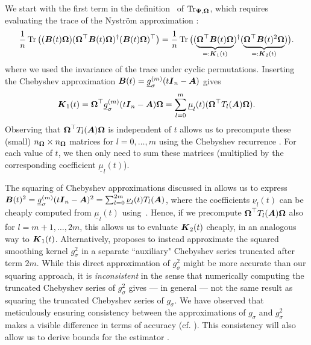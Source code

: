 We start with the first term in the definition~ of $\operatorname{Tr}_{\boldsymbol{\Psi}, \boldsymbol{\Omega}}$, which requires evaluating the trace of the 
Nyström approximation :
\begin{equation}
    \frac{1}{n} \operatorname{Tr} \big((\boldsymbol{B}(t) \boldsymbol{\Omega}) (\boldsymbol{\Omega}^{\top} \boldsymbol{B}(t) \boldsymbol{\Omega})^{\dagger} (\boldsymbol{B}(t) \boldsymbol{\Omega})^{\top} \big) =
    \frac{1}{n} \operatorname{Tr} \big((\underbrace{\boldsymbol{\Omega}^{\top} \boldsymbol{B}(t) \boldsymbol{\Omega}}_{=: \boldsymbol{K}_1(t)})^{\dagger} (\underbrace{\boldsymbol{\Omega}^{\top} \boldsymbol{B}(t)^2 \boldsymbol{\Omega}}_{=: \boldsymbol{K}_2(t)}) \big).
    \label{equ:cyclic-property}
\end{equation}
where we used the invariance of the trace under cyclic permutations.
Inserting the Chebyshev approximation  $\boldsymbol{B}(t) = \underline{g}_{\sigma}^{(m)}(t \boldsymbol{I}_n - \boldsymbol{A})$ gives
\begin{equation}
    \boldsymbol{K}_1(t) = \boldsymbol{\Omega}^{\top} \underline{g}_{\sigma}^{(m)}(t \boldsymbol{I}_n - \boldsymbol{A}) \boldsymbol{\Omega} = \sum_{l=0}^{m} \underline{\mu}_l(t) (\boldsymbol{\Omega}^{\top} T_l(\boldsymbol{A}) \boldsymbol{\Omega}).
\end{equation}
Observing that $\boldsymbol{\Omega}^{\top} T_l(\boldsymbol{A}) \boldsymbol{\Omega}$ is independent of $t$ allows us to precompute these (small) $n_{\boldsymbol{\Omega}} \times n_{\boldsymbol{\Omega}}$ matrices for $l=0, \dots, m$ using the Chebyshev recurrence . For each value of $t$, we then only need to sum these matrices (multiplied by the corresponding coefficient $\underline{\mu}_l(t)$).

The squaring of Chebyshev approximations discussed in  allows us to express $\boldsymbol{B}(t)^2 = \underline{g}_{\sigma}^{(m)}(t \boldsymbol{I}_n - \boldsymbol{A})^2 = \sum_{l=0}^{2m} \underline{\nu}_l(t) T_l(\boldsymbol{A})$, where the coefficients $\underline{\nu}_l(t)$ can be cheaply computed from $\underline{\mu}_l(t)$ using~. Hence, if we precompute
$\boldsymbol{\Omega}^{\top} T_l(\boldsymbol{A}) \boldsymbol{\Omega}$
also for $l=m+1, \dots, 2m$, this allows us to evaluate $\boldsymbol{K}_2(t)$ cheaply, in an analogous way to $\boldsymbol{K}_1(t)$. Alternatively, \cite{lin-2017-randomized-estimation} proposes to instead approximate the squared smoothing kernel $g_{\sigma}^2$ in a separate ``auxiliary" Chebyshev series truncated after term $2m$. While this direct approximation of $g_{\sigma}^2$ might be more accurate than our squaring approach, it is \emph{inconsistent} in the sense that numerically computing the truncated Chebyshev series of $g_{\sigma}^2$ gives --- in general --- not the same result as squaring the truncated Chebyshev series of $g_{\sigma}$. We have observed that meticulously ensuring consistency between the approximations of $g_{\sigma}$ and $g_{\sigma}^2$ makes a visible difference in terms of accuracy (cf. ). This consistency will also allow us to derive bounds for the estimator .

